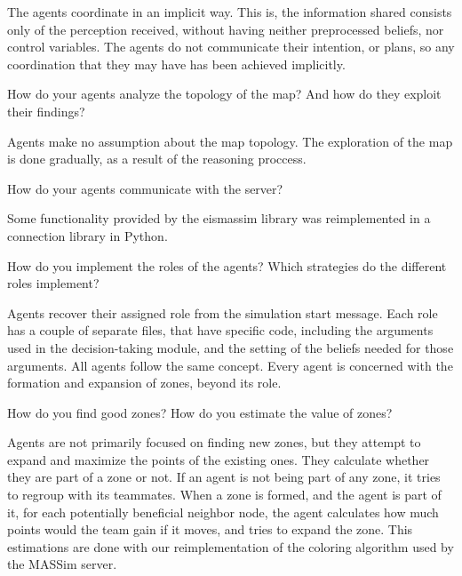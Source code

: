 The agents coordinate in an implicit way. This is, the  information shared 
consists only of the perception received, without having neither 
preprocessed beliefs, nor control variables. The agents do not communicate
their intention, or plans, so any coordination that they may have has been
achieved implicitly.

\begin{question}
How do your agents analyze the topology of the map? And how do they exploit
their findings? 
\end{question}

Agents make no assumption about the map topology. The exploration of the map 
is done gradually, as a result of the reasoning proccess.

\begin{question}
How do your agents communicate with the server?  
\end{question}

Some functionality provided by the eismassim library was reimplemented in a 
connection library in Python.

\begin{question}
How do you implement the roles of the agents? Which strategies do the
different roles implement?  
\end{question}

Agents recover their assigned role from the simulation start message.  
Each role has a couple of separate files, that have specific code, including 
the arguments used in the decision-taking module, and the setting of the 
beliefs needed for those arguments.
All agents follow the same concept. Every agent is concerned with the formation 
and expansion of zones, beyond its role.

\begin{question}
How do you find good zones? How do you estimate the value of zones?  
\end{question}

Agents are not primarily focused on finding new zones, but they attempt to 
expand and maximize the points of the existing ones. They calculate whether 
they are part of a zone or not. 
If an agent is not being part of any zone, it tries to regroup with its 
teammates. When a zone is formed, and the agent is part of it, for each potentially 
beneficial neighbor node, the agent calculates how much points would the team 
gain if it moves, and tries to expand the zone.
This estimations are done with our reimplementation of the coloring algorithm used 
by the MASSim server.

